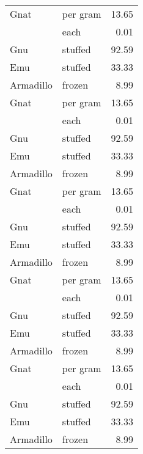 {\begin{center}
\begin{xtabular}{llr}
Gnat      & per gram & 13.65 \\
          & each     & 0.01  \\
Gnu       & stuffed  & 92.59 \\
Emu       & stuffed  & 33.33 \\
Armadillo & frozen   & 8.99  \\
Gnat      & per gram & 13.65 \\
          & each     & 0.01  \\
Gnu       & stuffed  & 92.59 \\
Emu       & stuffed  & 33.33 \\
Armadillo & frozen   & 8.99  \\
Gnat      & per gram & 13.65 \\
          & each     & 0.01  \\
Gnu       & stuffed  & 92.59 \\
Emu       & stuffed  & 33.33 \\
Armadillo & frozen   & 8.99  \\
Gnat      & per gram & 13.65 \\
          & each     & 0.01  \\
Gnu       & stuffed  & 92.59 \\
Emu       & stuffed  & 33.33 \\
Armadillo & frozen   & 8.99  \\
Gnat      & per gram & 13.65 \\
          & each     & 0.01  \\
Gnu       & stuffed  & 92.59 \\
Emu       & stuffed  & 33.33 \\
Armadillo & frozen   & 8.99  \\
\bottomrule
\end{xtabular}
\end{center}
} 
